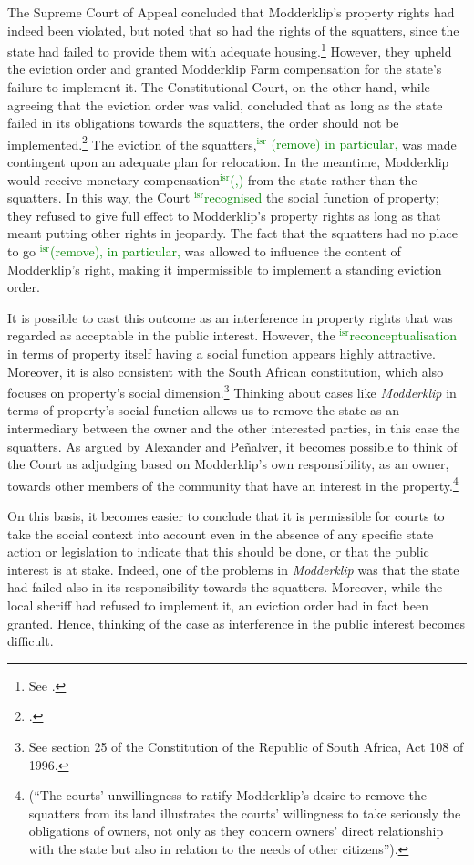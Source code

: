 \documentclass[12pt,a4paper]{book} %
\newcommand{\isr}[1]{\textcolor{green}{$^{\textrm{isr}}${#1}}}
\begin{document}
The Supreme Court of Appeal concluded that Modderklip's property rights had indeed been violated, but noted that so had the rights of the squatters, since the state had failed to provide them with adequate housing.\footnote{See \cite{modderklip04}.} However, they upheld the eviction order and granted Modderklip Farm compensation for the state's failure to implement it. The Constitutional Court, on the other hand, while agreeing that the eviction order was valid, concluded that as long as the state failed in its obligations towards the squatters, the order should not be implemented.\footcite{modderklip05} The eviction of the squatters,\isr{ (remove) in particular,} was made contingent upon an adequate plan for relocation. In the meantime, Modderklip would receive monetary compensation\isr{(,)} from the state rather than the squatters. In this way, the Court \isr{recognised} the social function of property; they refused to give full effect to Modderklip's property rights as long as that meant putting other rights in jeopardy. The fact that the squatters had no place to go \isr{(remove), in particular,} was allowed to influence the content of Modderklip's right, making it impermissible to implement a standing eviction order.

It is possible to cast this outcome as an interference in property rights that was regarded as acceptable in the public interest. However, the \isr{reconceptualisation} in terms of property itself having a social function appears highly attractive. Moreover, it is also consistent with the South African constitution, which also focuses on property's social dimension.\footnote{See section 25 of the Constitution of the Republic of South Africa, Act 108 of 1996.} Thinking about cases like {\it Modderklip} in terms of property's social function allows us to remove the state as an intermediary between the owner and the other interested parties, in this case the squatters. As argued by Alexander and Pe\~{n}alver, it becomes possible to think of the Court as adjudging based on Modderklip's own responsibility, as an owner, towards other members of the community that have an interest in the property.\footnote{\cite[157]{alexander11} (``The courts' unwillingness to ratify Modderklip's desire to remove the squatters from its land illustrates the courts' willingness to take seriously the obligations of owners, not only as they concern owners' direct relationship with the state but also in relation to the needs of other citizens'').}

On this basis, it becomes easier to conclude that it is permissible for courts to take the social context into account even in the absence of any specific state action or legislation to indicate that this should be done, or that the public interest is at stake. Indeed, one of the problems in {\it Modderklip} was that the state had failed also in its responsibility towards the squatters. Moreover, while the local sheriff had refused to implement it, an eviction order had in fact been granted. Hence, thinking of the case as interference in the public interest becomes difficult.
\end{document}
